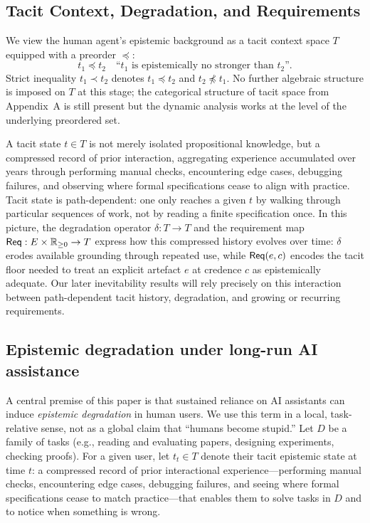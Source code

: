 \subsection{Tacit Context, Degradation, and Requirements}

We view the human agent’s epistemic background as a tacit context space $T$ equipped with a
preorder $\preceq$:
\[
  t_1 \preceq t_2 \quad\text{“$t_1$ is epistemically no stronger than $t_2$”.}
\]
Strict inequality $t_1 \prec t_2$ denotes $t_1 \preceq t_2$ and $t_2 \not\preceq t_1$. No further
algebraic structure is imposed on $T$ at this stage; the categorical structure of tacit space from
Appendix~A is still present but the dynamic analysis works at the level of the underlying
preordered set.


A tacit state $t \in T$ is not merely isolated propositional knowledge, but a compressed record of prior interaction, aggregating experience accumulated over years through performing manual checks, encountering edge cases, debugging failures, and observing where formal specifications cease to align with practice. Tacit state is path-dependent: one only
reaches a given $t$ by walking through particular sequences of work, not by reading a finite
specification once. In this picture, the degradation operator $\delta : T \to T$ and the requirement
map $\mathsf{Req} : E \times \mathbb{R}_{\ge 0} \to T$ express how this compressed history evolves over
time: $\delta$ erodes available grounding through repeated use, while $\mathsf{Req}(e,c)$ encodes the
tacit floor needed to treat an explicit artefact $e$ at credence $c$ as epistemically adequate. Our
later inevitability results will rely precisely on this interaction between path-dependent tacit
history, degradation, and growing or recurring requirements.
\subsection{Epistemic degradation under long-run AI assistance}
\label{subsec:epistemic-degradation}

A central premise of this paper is that sustained reliance on AI assistants can induce
\emph{epistemic degradation} in human users. We use this term in a local, task-relative sense,
not as a global claim that ``humans become stupid.'' Let $D$ be a family of tasks (e.g.,
reading and evaluating papers, designing experiments, checking proofs). For a given user,
let $t_t \in T$ denote their tacit epistemic state at time $t$: a compressed record of prior
interactional experience---performing manual checks, encountering edge cases, debugging
failures, and seeing where formal specifications cease to match practice---that enables them
to solve tasks in $D$ and to notice when something is wrong.

